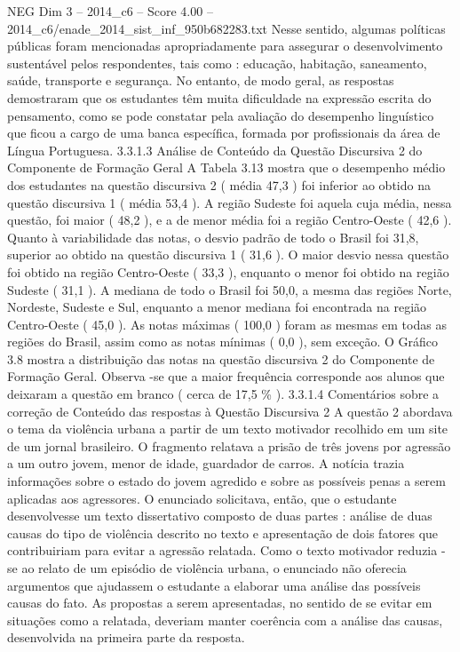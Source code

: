 \begin{textsample}{NEG Dim 3 – 2014\_c6 – Score 4.00 – 2014\_c6/enade\_2014\_sist\_inf\_950b682283.txt}
Nesse sentido, algumas políticas públicas foram mencionadas apropriadamente para assegurar o desenvolvimento sustentável pelos respondentes, tais como : educação, habitação, saneamento, saúde, transporte e segurança.
No entanto, de modo geral, as respostas demostraram que os estudantes têm muita dificuldade na expressão escrita do pensamento, como se pode constatar pela avaliação do desempenho linguístico que ficou a cargo de uma banca específica, formada por profissionais da área de Língua Portuguesa. 3.3.1.3 Análise de Conteúdo da Questão Discursiva 2 do Componente de Formação Geral A Tabela 3.13 mostra que o desempenho médio dos estudantes na questão discursiva 2 ( média 47,3 ) foi inferior ao obtido na questão discursiva 1 ( média 53,4 ).
A região Sudeste foi aquela cuja média, nessa questão, foi maior ( 48,2 ), e a de menor média foi a região Centro-Oeste ( 42,6 ).
Quanto à variabilidade das notas, o desvio padrão de todo o Brasil foi 31,8, superior ao obtido na questão discursiva 1 ( 31,6 ).
O maior desvio nessa questão foi obtido na região Centro-Oeste ( 33,3 ), enquanto o menor foi obtido na região Sudeste ( 31,1 ).
A mediana de todo o Brasil foi 50,0, a mesma das regiões Norte, Nordeste, Sudeste e Sul, enquanto a menor mediana foi encontrada na região Centro-Oeste ( 45,0 ).
As notas máximas ( 100,0 ) foram as mesmas em todas as regiões do Brasil, assim como as notas mínimas ( 0,0 ), sem exceção.
O Gráfico 3.8 mostra a distribuição das notas na questão discursiva 2 do Componente de Formação Geral.
Observa -se que a maior frequência corresponde aos alunos que deixaram a questão em branco ( cerca de 17,5 \% ). 3.3.1.4 Comentários sobre a correção de Conteúdo das respostas à Questão Discursiva 2 A questão 2 abordava o tema da violência urbana a partir de um texto motivador recolhido em um site de um jornal brasileiro.
O fragmento relatava a prisão de três jovens por agressão a um outro jovem, menor de idade, guardador de carros.
A notícia trazia informações sobre o estado do jovem agredido e sobre as possíveis penas a serem aplicadas aos agressores.
O enunciado solicitava, então, que o estudante desenvolvesse um texto dissertativo composto de duas partes : análise de duas causas do tipo de violência descrito no texto e apresentação de dois fatores que contribuiriam para evitar a agressão relatada.
Como o texto motivador reduzia -se ao relato de um episódio de violência urbana, o enunciado não oferecia argumentos que ajudassem o estudante a elaborar uma análise das possíveis causas do fato.
As propostas a serem apresentadas, no sentido de se evitar em situações como a relatada, deveriam manter coerência com a análise das causas, desenvolvida na primeira parte da resposta.

\end{textsample}

